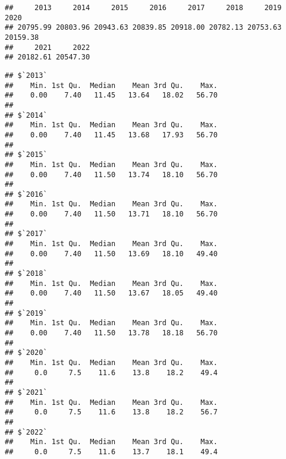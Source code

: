 \documentclass[
]{article}
\newenvironment{Shaded}{\begin{snugshade}}{\end{snugshade}}
\newcommand{\AttributeTok}[1]{\textcolor[rgb]{0.13,0.29,0.53}{#1}}
\newcommand{\ConstantTok}[1]{\textcolor[rgb]{0.56,0.35,0.01}{#1}}
\newcommand{\FunctionTok}[1]{\textcolor[rgb]{0.13,0.29,0.53}{\textbf{#1}}}
\newcommand{\NormalTok}[1]{#1}
\newcommand{\SpecialCharTok}[1]{\textcolor[rgb]{0.81,0.36,0.00}{\textbf{#1}}}
\begin{document}
\begin{Shaded}
\end{Shaded}

\begin{verbatim}
##     2013     2014     2015     2016     2017     2018     2019     2020 
## 20795.99 20803.96 20943.63 20839.85 20918.00 20782.13 20753.63 20159.38 
##     2021     2022 
## 20182.61 20547.30
\end{verbatim}

\begin{Shaded}
\end{Shaded}

\begin{verbatim}
## $`2013`
##    Min. 1st Qu.  Median    Mean 3rd Qu.    Max. 
##    0.00    7.40   11.45   13.64   18.02   56.70 
## 
## $`2014`
##    Min. 1st Qu.  Median    Mean 3rd Qu.    Max. 
##    0.00    7.40   11.45   13.68   17.93   56.70 
## 
## $`2015`
##    Min. 1st Qu.  Median    Mean 3rd Qu.    Max. 
##    0.00    7.40   11.50   13.74   18.10   56.70 
## 
## $`2016`
##    Min. 1st Qu.  Median    Mean 3rd Qu.    Max. 
##    0.00    7.40   11.50   13.71   18.10   56.70 
## 
## $`2017`
##    Min. 1st Qu.  Median    Mean 3rd Qu.    Max. 
##    0.00    7.40   11.50   13.69   18.10   49.40 
## 
## $`2018`
##    Min. 1st Qu.  Median    Mean 3rd Qu.    Max. 
##    0.00    7.40   11.50   13.67   18.05   49.40 
## 
## $`2019`
##    Min. 1st Qu.  Median    Mean 3rd Qu.    Max. 
##    0.00    7.40   11.50   13.78   18.18   56.70 
## 
## $`2020`
##    Min. 1st Qu.  Median    Mean 3rd Qu.    Max. 
##     0.0     7.5    11.6    13.8    18.2    49.4 
## 
## $`2021`
##    Min. 1st Qu.  Median    Mean 3rd Qu.    Max. 
##     0.0     7.5    11.6    13.8    18.2    56.7 
## 
## $`2022`
##    Min. 1st Qu.  Median    Mean 3rd Qu.    Max. 
##     0.0     7.5    11.6    13.7    18.1    49.4
\end{verbatim}
\end{document}
